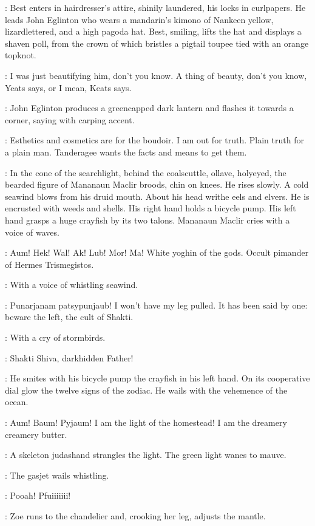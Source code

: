 :
Best enters in hairdresser's attire,
shinily laundered,
his locks in curlpapers.
He leads John Eglinton who wears a mandarin's kimono of Nankeen yellow,
lizardlettered,
and a high pagoda hat.
Best,
smiling,
lifts the hat and displays a shaven poll,
from the crown of which bristles a pigtail toupee tied with an orange topknot.

\Best:
I was just beautifying him,
don't you know.
A thing of beauty,
don't you know,
Yeats says,
or I mean,
Keats says.

:
John Eglinton produces a greencapped dark lantern
and flashes it towards a corner,
saying with carping accent.

\JohnEglinton:
Esthetics and cosmetics are for the boudoir.
I am out for truth.
Plain truth for a plain man.
Tanderagee wants the facts and means to get them.%

:
In the cone of the searchlight,
behind the coalscuttle,
ollave,
holyeyed,
the bearded figure of Mananaun Maclir broods,
chin on knees.
He rises slowly.
A cold seawind blows from his druid mouth.
About his head writhe eels and elvers.
He is encrusted with weeds and shells.
His right hand holds a bicycle pump.
His left hand grasps a huge crayfish by its two talons.
Mananaun Maclir cries with a voice of waves.

\MananaunMaclir:
Aum!
Hek!
Wal!
Ak!
Lub!
Mor!
Ma!
White yoghin of the gods.
Occult pimander of Hermes Trismegistos.

:
With a voice of whistling seawind.

\MananaunMaclir:
Punarjanam patsypunjaub!
I won't have my leg pulled.
It has been said by one:
beware the left,
the cult of Shakti.

:
With a cry of stormbirds.

\MananaunMaclir:
Shakti Shiva,
darkhidden Father!

:
He smites with his bicycle pump the crayfish in his left hand.
On its cooperative dial glow the twelve signs of the zodiac.
He wails with the vehemence of the ocean.

\MananaunMaclir:
Aum!
Baum!
Pyjaum!
I am the light of the homestead!
I am the dreamery creamery butter.

:
A skeleton judashand strangles the light.
The green light wanes to mauve.

:
The gasjet wails whistling.

\Gasjet:
Pooah!
Pfuiiiiiii!

:
Zoe runs to the chandelier and,
crooking her leg,
adjusts the mantle.

